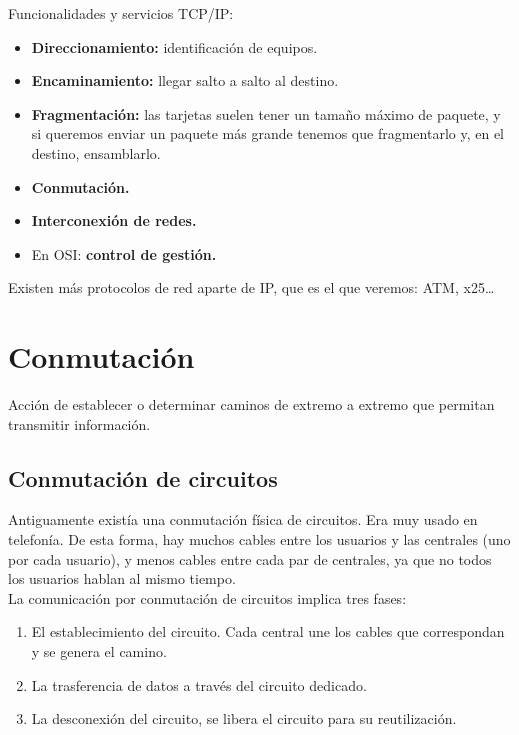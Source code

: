 Funcionalidades y servicios TCP\@/IP\@:
\begin{itemize}
    \item \textbf{Direccionamiento:} identificación de equipos.
    \item \textbf{Encaminamiento:} llegar salto a salto al destino. 
    \item \textbf{Fragmentación:} las tarjetas suelen tener un tamaño máximo de paquete, y si queremos enviar un paquete más grande tenemos que fragmentarlo y, en el destino, ensamblarlo. 
    \item \textbf{Conmutación.} 
    \item \textbf{Interconexión de redes.}
    \item En OSI\@: \textbf{control de gestión.}
\end{itemize} 

Existen más protocolos de red aparte de IP\@, que es el que veremos: ATM\@, x25\ldots

\section{Conmutación}

\begin{definicion}[Conmutación]
    Acción de establecer o determinar caminos de extremo a extremo que permitan transmitir información.         
\end{definicion}

\subsection{Conmutación de circuitos}

Antiguamente existía una conmutación física de circuitos. Era muy usado en telefonía. De esta forma, hay muchos cables entre los usuarios y las centrales (uno por cada usuario), y menos cables entre cada par de centrales, ya que no todos los usuarios hablan al mismo tiempo. \\

La comunicación por conmutación de circuitos implica tres fases:
\begin{enumerate}
    \item El establecimiento del circuito. Cada central une los cables que correspondan y se genera el camino. 
    \item La trasferencia de datos a través del circuito dedicado.
    \item La desconexión del circuito, se libera el circuito para su reutilización.
\end{enumerate}

